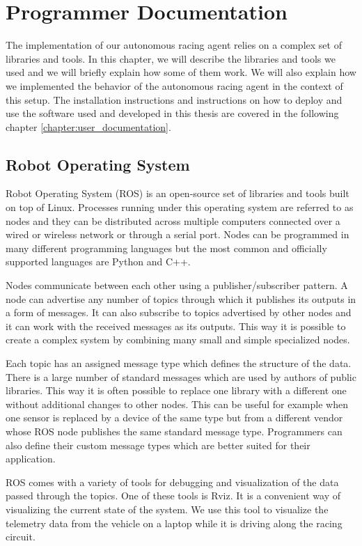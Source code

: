 \chapter{Programmer Documentation}

The implementation of our autonomous racing agent relies on a complex set of libraries and tools. In this chapter, we will describe the libraries and tools we used and we will briefly explain how some of them work. We will also explain how we implemented the behavior of the autonomous racing agent in the context of this setup. The installation instructions and instructions on how to deploy and use the software used and developed in this thesis are covered in the following chapter \ref{chapter:user_documentation}.

\section{Robot Operating System}

Robot Operating System (ROS) is an open-source set of libraries and tools built on top of Linux. Processes running under this operating system are referred to as nodes and they can be distributed across multiple computers connected over a wired or wireless network or through a serial port. Nodes can be programmed in many different programming languages but the most common and officially supported languages are Python and C++.

Nodes communicate between each other using a publisher/subscriber pattern. A node can advertise any number of topics through which it publishes its outputs in a form of messages. It can also subscribe to topics advertised by other nodes and it can work with the received messages as its outputs. This way it is possible to create a complex system by combining many small and simple specialized nodes.

Each topic has an assigned message type which defines the structure of the data. There is a large number of standard messages which are used by authors of public libraries. This way it is often possible to replace one library with a different one without additional changes to other nodes. This can be useful for example when one sensor is replaced by a device of the same type but from a different vendor whose ROS node publishes the same standard message type. Programmers can also define their custom message types which are better suited for their application.

ROS comes with a variety of tools for debugging and visualization of the data passed through the topics. One of these tools is Rviz. It is a convenient way of visualizing the current state of the system. We use this tool to visualize the telemetry data from the vehicle on a laptop while it is driving along the racing circuit.


